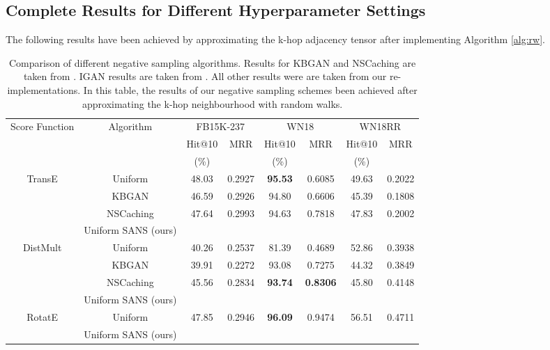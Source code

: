 \subsection{Complete Results for Different Hyperparameter Settings} 
 
The following results have been achieved by approximating the k-hop adjacency tensor after implementing Algorithm \ref{alg:rw}. 



\begin{table*}[h]
\begin{small}
\centering
\begin{tabular}{cccccccc}
\hline
\multirow{3}{2cm}{\centering Score Function}& \multirow{3}{2cm}{Algorithm} & \multicolumn{2}{c}{FB15K-237} & \multicolumn{2}{c}{WN18} & \multicolumn{2}{c}{WN18RR} \\
& & Hit@10 & \multirow{2}{1cm}{\centering MRR} & Hit@10 & \multirow{2}{1cm}{\centering MRR} & Hit@10 & \multirow{2}{1cm}{\centering MRR} \\ 
& & (\%) & & (\%) & & (\%) & \\
\hline
\multirow{4}{1.5cm}{\centering TransE} & Uniform \cite{sun2019rotate} & 48.03 & 0.2927 & \textbf{95.53} & 0.6085 & 49.63 & 0.2022 \\
& KBGAN \cite{cai2017kbgan} & 46.59 & 0.2926 & 94.80 & 0.6606 & 45.39 & 0.1808 \\
& NSCaching \cite{zhang2019nscaching} & 47.64 & 0.2993 & 94.63 & 0.7818 & 47.83 & 0.2002 \\
& Uniform SANS (ours) &  &  &  &  &  &  \\
\hline
\multirow{4}{1.5cm}{\centering DistMult} & Uniform & 40.26 & 0.2537 & 81.39  & 0.4689 & 52.86 & 0.3938 \\
& KBGAN & 39.91 & 0.2272 & 93.08 & 0.7275 & 44.32 & 0.3849 \\
& NSCaching & 45.56 & 0.2834 & \textbf{93.74} & \textbf{0.8306} & 45.80 & 0.4148 \\
& Uniform SANS (ours)  &  &  &  &  &  &  \\
\hline
\multirow{2}{1cm}{\centering RotatE} & Uniform & 47.85 & 0.2946 & \textbf{96.09} & 0.9474 & 56.51 & 0.4711 \\
& Uniform SANS (ours) &  &  &  &  &  &  \\
\hline
\end{tabular}
\caption{Comparison of different negative sampling algorithms. Results for KBGAN and NSCaching are taken from \cite{zhang2019nscaching}. IGAN results are taken from \cite{wang2018incorporating}. 
All other results were are taken from our re-implementations. In this table, the results of our negative sampling schemes been achieved after approximating the k-hop neighbourhood with random walks.}
\label{tab:comparison3}
\end{small}
\end{table*}


